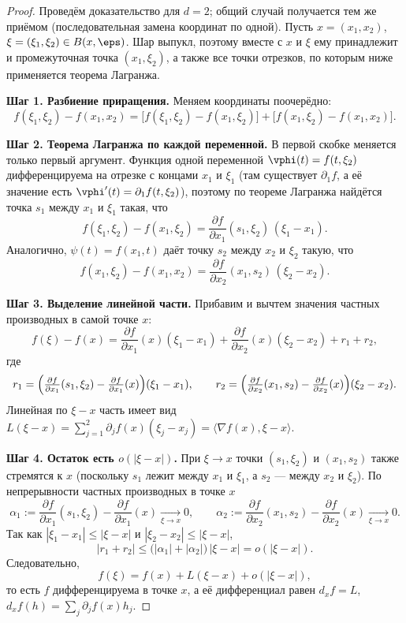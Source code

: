 \begin{proof}
	Проведём доказательство для $d=2$; общий случай получается тем же приёмом (последовательная замена координат по одной). Пусть $x=(x_1,x_2)$, $\xi=(\xi_1,\xi_2)\in B(x,\eps)$. Шар выпукл, поэтому вместе с $x$ и $\xi$ ему принадлежит и промежуточная точка $(x_1,\xi_2)$, а также все точки отрезков, по которым ниже применяется теорема Лагранжа.

	\textbf{Шаг 1. Разбиение приращения.} Меняем координаты поочерёдно:
	\[
	f(\xi_1,\xi_2)-f(x_1,x_2)
	=\bigl[f(\xi_1,\xi_2)-f(x_1,\xi_2)\bigr]+\bigl[f(x_1,\xi_2)-f(x_1,x_2)\bigr].
	\]

	\textbf{Шаг 2. Теорема Лагранжа по каждой переменной.} В первой скобке меняется только первый аргумент. Функция одной переменной $\vphi(t)=f(t,\xi_2)$ дифференцируема на отрезке с концами $x_1$ и $\xi_1$ (там существует $\partial_1 f$, а её значение есть $\vphi'(t)=\partial_1 f(t,\xi_2)$), поэтому по теореме Лагранжа найдётся точка $s_1$ между $x_1$ и $\xi_1$ такая, что
	\[
	f(\xi_1,\xi_2)-f(x_1,\xi_2)=\frac{\partial f}{\partial x_1}(s_1,\xi_2)\,(\xi_1-x_1).
	\]
	Аналогично, $\psi(t)=f(x_1,t)$ даёт точку $s_2$ между $x_2$ и $\xi_2$ такую, что
	\[
	f(x_1,\xi_2)-f(x_1,x_2)=\frac{\partial f}{\partial x_2}(x_1,s_2)\,(\xi_2-x_2).
	\]

	\textbf{Шаг 3. Выделение линейной части.} Прибавим и вычтем значения частных производных в самой точке $x$:
	\[
	f(\xi)-f(x)=\frac{\partial f}{\partial x_1}(x)(\xi_1-x_1)+\frac{\partial f}{\partial x_2}(x)(\xi_2-x_2)+r_1+r_2,
	\]
	где
	\[
	r_1=\Bigl(\tfrac{\partial f}{\partial x_1}(s_1,\xi_2)-\tfrac{\partial f}{\partial x_1}(x)\Bigr)(\xi_1-x_1),\qquad
	r_2=\Bigl(\tfrac{\partial f}{\partial x_2}(x_1,s_2)-\tfrac{\partial f}{\partial x_2}(x)\Bigr)(\xi_2-x_2).
	\]
	Линейная по $\xi-x$ часть имеет вид $L(\xi-x)=\sum_{j=1}^{2}\partial_j f(x)(\xi_j-x_j)=\langle\nabla f(x),\xi-x\rangle$.

	\textbf{Шаг 4. Остаток есть $o(|\xi-x|)$.} При $\xi\to x$ точки $(s_1,\xi_2)$ и $(x_1,s_2)$ также стремятся к $x$ (поскольку $s_1$ лежит между $x_1$ и $\xi_1$, а $s_2$ --- между $x_2$ и $\xi_2$). По непрерывности частных производных в точке $x$
	\[
	\alpha_1:=\frac{\partial f}{\partial x_1}(s_1,\xi_2)-\frac{\partial f}{\partial x_1}(x)\xrightarrow[\xi\to x]{}0,\qquad
	\alpha_2:=\frac{\partial f}{\partial x_2}(x_1,s_2)-\frac{\partial f}{\partial x_2}(x)\xrightarrow[\xi\to x]{}0.
	\]
	Так как $|\xi_1-x_1|\le|\xi-x|$ и $|\xi_2-x_2|\le|\xi-x|$,
	\[
	|r_1+r_2|\le\bigl(|\alpha_1|+|\alpha_2|\bigr)\,|\xi-x|=o(|\xi-x|).
	\]
	Следовательно,
	\[
	f(\xi)=f(x)+L(\xi-x)+o(|\xi-x|),
	\]
	то есть $f$ дифференцируема в точке $x$, а её дифференциал равен $d_xf=L$, $d_xf(h)=\sum_{j}\partial_j f(x)h_j$.
\end{proof}

